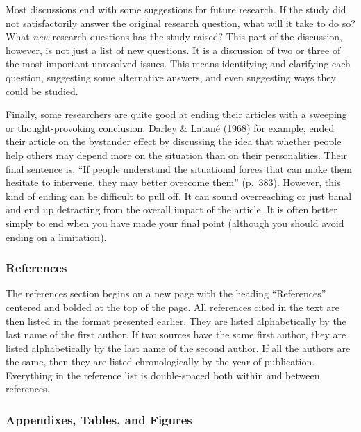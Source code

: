 \documentclass[
]{krantz}
\begin{document}
Most discussions end with some suggestions for future research. If the study did not satisfactorily answer the original research question, what will it take to do so? What \emph{new} research questions has the study raised? This part of the discussion, however, is not just a list of new questions. It is a discussion of two or three of the most important unresolved issues. This means identifying and clarifying each question, suggesting some alternative answers, and even suggesting ways they could be studied.

Finally, some researchers are quite good at ending their articles with a sweeping or thought-provoking conclusion. Darley \& Latané (\protect\hyperlink{ref-darley1968bystander}{1968}) for example, ended their article on the bystander effect by discussing the idea that whether people help others may depend more on the situation than on their personalities. Their final sentence is, ``If people understand the situational forces that can make them hesitate to intervene, they may better overcome them'' (p.~383). However, this kind of ending can be difficult to pull off. It can sound overreaching or just banal and end up detracting from the overall impact of the article. It is often better simply to end when you have made your final point (although you should avoid ending on a limitation).

\hypertarget{references-1}{%
\subsubsection*{References}\label{references-1}}


The references section begins on a new page with the heading ``References'' centered and bolded at the top of the page. All references cited in the text are then listed in the format presented earlier. They are listed alphabetically by the last name of the first author. If two sources have the same first author, they are listed alphabetically by the last name of the second author. If all the authors are the same, then they are listed chronologically by the year of publication. Everything in the reference list is double-spaced both within and between references.

\hypertarget{appendixes-tables-and-figures}{%
\subsubsection*{Appendixes, Tables, and Figures}\label{appendixes-tables-and-figures}}
\end{document}
